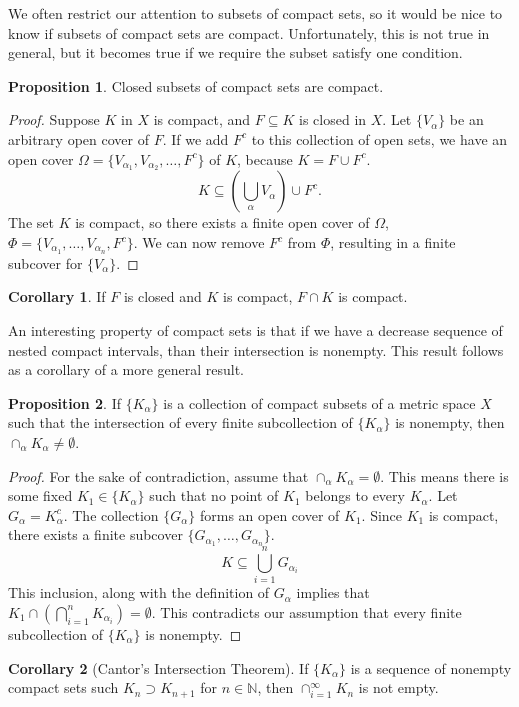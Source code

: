 \documentclass{article}
\newcommand{\N}{\mathbb{N}}
\theoremstyle{definition}
\newtheorem{proposition}{Proposition}[section]
\newtheorem{corollary}{Corollary}[section]
\begin{document}
We often restrict our attention to subsets of compact sets, so it would be nice to know if subsets of compact sets are compact. Unfortunately, this is not true in general, but it becomes true if we require the subset satisfy one condition. 
\begin{proposition}
	Closed subsets of compact sets are compact.
\end{proposition}
\begin{proof}
	Suppose $ K $ in $ X $ is compact, and $ F\subseteq K $ is closed in $ X $. Let $ \{V_\alpha\} $ be an arbitrary open cover of $ F $. If we add $ F^c $ to this collection of open sets, we have an open cover $ \Omega=\{V_{\alpha_1},V_{\alpha_2},\ldots,F^c\} $ of $ K $, because $ K=F\cup F^c $. $$ K\subseteq\left(\bigcup_\alpha V_\alpha\right)\cup F^c.$$ The set $ K $ is compact, so there exists a finite open cover of $ \Omega $, $ \Phi=\{V_{\alpha_1},\ldots,V_{\alpha_n}, F^c\} $. We can now remove $ F^c $ from $ \Phi $, resulting in a finite subcover for $ \{V_\alpha\} $. 
\end{proof}
\begin{corollary}
	If $ F $ is closed and $ K $ is compact, $ F\cap K $ is compact. 
\end{corollary}
An interesting property of compact sets is that if we have a decrease sequence of nested compact intervals, than their intersection is nonempty. This result follows as a corollary of a more general result.
\begin{proposition}
	If $ \{K_\alpha\} $ is a collection of compact subsets of a metric space $ X $ such that the intersection of every finite subcollection of $ \{K_\alpha\} $ is nonempty, then $ \cap_\alpha K_\alpha\neq\emptyset $. 
\end{proposition}
\begin{proof}
For the sake of contradiction, assume that $ \cap_\alpha K_\alpha=\emptyset $. This means there is some fixed $K_1\in \{K_\alpha\}$ such that no point of $ K_1 $ belongs to every $ K_\alpha $. Let $ G_\alpha= K_\alpha^c $. The collection $ \{G_\alpha\} $ forms an open cover of $ K_1$. Since $ K_1 $ is compact, there exists a finite subcover $ \{G_{\alpha_1},\ldots,G_{\alpha_n}\} $. $$ K\subseteq\bigcup_{i=1}^nG_{\alpha_i}$$ This inclusion, along with the definition of $ G_\alpha $ implies that $ K_1\cap\left(\bigcap_{i=1}^nK_{\alpha_i}\right)=\emptyset $. This contradicts our assumption that every finite subcollection of $ \{K_\alpha\} $ is nonempty. 
\end{proof}
\begin{corollary}[Cantor's Intersection Theorem]
If $ \{K_\alpha\} $ is a sequence of nonempty compact sets such $ K_{n}\supset K_{n+1} $ for $ n\in\N $, then $ \cap_{i=1}^\infty K_n $ is not empty.
\end{corollary}
\end{document}
